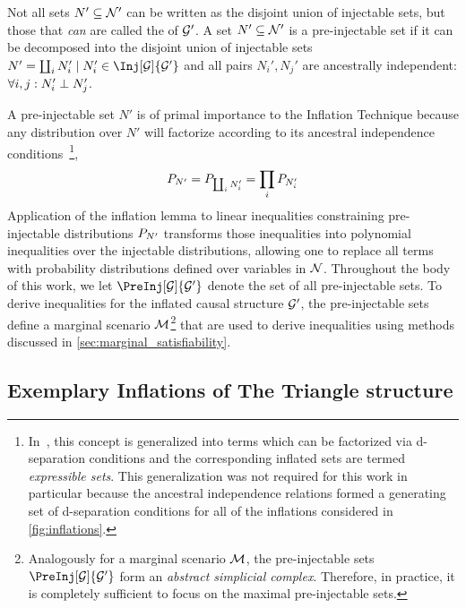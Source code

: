 \documentclass[aps, 10pt, english, twoside, pra, nofootinbib, tightenlines, longbibliography, superscriptaddress]{revtex4-1}
\begin{document}
    Not all sets $N' \subseteq \mathcal{N}'$ can be written as the disjoint union of injectable sets, but those that \textit{can} are called the  of $\mathcal{G}'$. A set $N' \subseteq \mathcal{N}'$ is a pre-injectable set if it can be decomposed into the disjoint union of injectable sets $N' = \coprod_{i} N'_i \mid N'_i \in \Inj[\graph]{\graph'}$ and all pairs $N_i', N_j'$ are ancestrally independent: $\forall i, j : N_i' \perp N_j'$.

    A pre-injectable set $N'$ is of primal importance to the Inflation Technique because any distribution over $N'$ will factorize according to its ancestral independence conditions~\cite{Pearl_2009}\footnote{In~\cite{Inflation}, this concept is generalized into terms which can be factorized via d-separation conditions and the corresponding inflated sets are termed \textit{expressible sets}. This generalization was not required for this work in particular because the ancestral independence relations formed a generating set of d-separation conditions for all of the inflations considered in \cref{fig:inflations}.},
    \[ \prob[N'] = \prob[\coprod_i N'_i] = \prod_{i}\prob[N'_i] \]
    Application of the inflation lemma to linear inequalities constraining pre-injectable distributions $\prob[N']$ transforms those inequalities into polynomial inequalities over the injectable distributions, allowing one to replace all terms with probability distributions defined over variables in $\mathcal{N}$. Throughout the body of this work, we let $\PreInj[\graph]{\graph'}$ denote the set of all pre-injectable sets. To derive inequalities for the inflated causal structure $\mathcal{G}'$, the pre-injectable sets define a marginal scenario $\mathcal{M}$\footnote{Analogously for a marginal scenario $\mathcal{M}$, the pre-injectable sets $\PreInj[\graph]{\graph'}$ form an \textit{abstract simplicial complex}. Therefore, in practice, it is completely sufficient to focus on the maximal pre-injectable sets.} that are used to derive inequalities using methods discussed in \cref{sec:marginal_satisfiability}.

    \subsection{Exemplary Inflations of The Triangle structure}
    \label{sec:exemplary_inflations_of_the_triangle structure}
\end{document}
